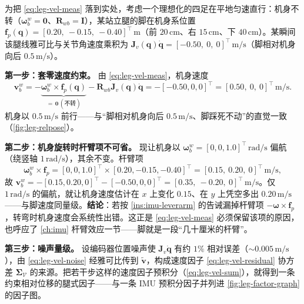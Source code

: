 \begin{example}[四足单腿速度里程计的代数走查]\label{ex:leg-velocity}
为把 \cref{eq:leg-vel-meas} 落到实处，考虑一个理想化的四足在平地匀速直行：机身不转（$\boldsymbol{\omega}_b^w=\mathbf{0}$、$\mathbf{R}_{wb}=\mathbf{I}$），某站立腿的脚在机身系位置 $\mathbf{f}_p(\mathbf{q})=[0.20,\ -0.15,\ -0.40]^\top\,\mathrm{m}$（前 $20\,\mathrm{cm}$、右 $15\,\mathrm{cm}$、下 $40\,\mathrm{cm}$）。某瞬间该腿线雅可比与关节角速度乘积为 $\mathbf{J}_v(\mathbf{q})\dot{\mathbf{q}}=[-0.50,\ 0,\ 0]^\top\,\mathrm{m/s}$（脚相对机身向后 $0.5\,\mathrm{m/s}$）。

\textbf{第一步：套零速度约束。} 由 \cref{eq:leg-vel-meas}，机身速度
\[
  \mathbf{v}_b^w=-\underbrace{\boldsymbol{\omega}_b^w\times\mathbf{f}_p(\mathbf{q})}_{=\,\mathbf{0}\,(\text{不转})}-\mathbf{R}_{wb}\mathbf{J}_v(\mathbf{q})\dot{\mathbf{q}}=-[-0.50,0,0]^\top=[0.50,\ 0,\ 0]^\top\,\mathrm{m/s}.
\]
机身以 $0.5\,\mathrm{m/s}$ 前行——与“脚相对机身向后 $0.5\,\mathrm{m/s}$、脚踩死不动”的直觉一致（\cref{fig:leg-relpose}）。

\textbf{第二步：机身旋转时杆臂项不可省。} 现让机身以 $\boldsymbol{\omega}_b^w=[0,0,1.0]^\top\,\mathrm{rad/s}$ 偏航（绕竖轴 $1\,\mathrm{rad/s}$），其余不变。杆臂项
\[
  \boldsymbol{\omega}_b^w\times\mathbf{f}_p=[0,0,1.0]^\top\times[0.20,-0.15,-0.40]^\top=[0.15,\ 0.20,\ 0]^\top\,\mathrm{m/s},
\]
故 $\mathbf{v}_b^w=-[0.15,0.20,0]^\top-[-0.50,0,0]^\top=[0.35,\ -0.20,\ 0]^\top\,\mathrm{m/s}$。仅 $1\,\mathrm{rad/s}$ 的偏航，就让机身速度估计在 $x$ 上变化 $0.15$、在 $y$ 上凭空多出 $0.20\,\mathrm{m/s}$——与脚速度同量级。\textbf{结论}：若按 \cref{ins:imu-leverarm} 的告诫漏掉杆臂项 $-\boldsymbol{\omega}\times\mathbf{f}_p$，转弯时机身速度会系统性出错。这正是 \cref{eq:leg-vel-meas} 必须保留该项的原因，也呼应了 \cref{ch:imu} 杆臂效应一节——脚就是一段“几十厘米的杆臂”。

\textbf{第三步：噪声量级。} 设编码器位置噪声使 $\mathbf{J}_v\dot{\mathbf{q}}$ 有约 $1\%$ 相对误差（$\sim0.005\,\mathrm{m/s}$），由 \cref{eq:leg-vel-noise} 经雅可比传到 $\tilde{\mathbf{v}}$，构成速度因子 \cref{eq:leg-vel-residual} 协方差 $\boldsymbol{\Sigma}_{\mathcal{V}}$ 的来源。把若干步这样的速度因子预积分（\cref{eq:leg-vel-sum}），就得到一条约束相对位移的腿式因子——与一条 IMU 预积分因子并列进 \cref{fig:leg-factor-graph} 的因子图。
\end{example}

